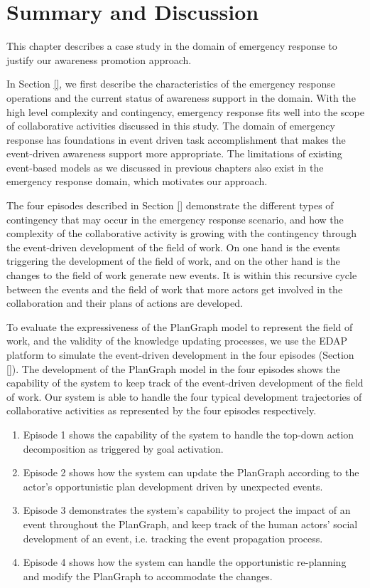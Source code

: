 \section{Summary and Discussion} %
\label{sec:summary_and_discussion}
This chapter describes a case study in the domain of emergency response to justify our awareness promotion approach. 

In Section \ref{}, we first describe the characteristics of the emergency response operations and the current status of awareness support in the domain. With the high level complexity and contingency, emergency response fits well into the scope of collaborative activities discussed in this study. The domain of emergency response has foundations in event driven task accomplishment that makes the event-driven awareness support more appropriate. The limitations of existing event-based models as we discussed in previous chapters also exist in the emergency response domain, which motivates our approach.

The four episodes described in Section \ref{} demonstrate the different types of contingency that may occur in the emergency response scenario, and how the complexity of the collaborative activity is growing with the contingency through the event-driven development of the field of work. On one hand is the events triggering the development of the field of work, and on the other hand is the changes to the field of work generate new events. It is within this recursive cycle between the events and the field of work that more actors get involved in the collaboration and their plans of actions are developed.

To evaluate the expressiveness of the PlanGraph model to represent the field of work, and the validity of the knowledge updating processes, we use the EDAP platform to simulate the event-driven development in the four episodes (Section \ref{}). The development of the PlanGraph model in the four episodes shows the capability of the system to keep track of the event-driven development of the field of work. Our system is able to handle the four typical development trajectories of collaborative activities as represented by the four episodes respectively. 

\begin{enumerate}
	\item Episode 1 shows the capability of the system to handle the top-down action decomposition as triggered by goal activation.
	\item Episode 2 shows how the system can update the PlanGraph according to the actor's opportunistic plan development driven by unexpected events.
	\item Episode 3 demonstrates the system's capability to project the impact of an event throughout the PlanGraph, and keep track of the human actors' social development of an event, i.e. tracking the event propagation process.
	\item Episode 4 shows how the system can handle the opportunistic re-planning and modify the PlanGraph to accommodate the changes.
\end{enumerate}

